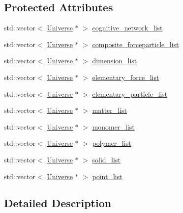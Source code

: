\subsection*{Protected Attributes}
\begin{DoxyCompactItemize}
\item 
std\+::vector$<$ \mbox{\hyperlink{class_universe}{Universe}} $\ast$ $>$ \mbox{\hyperlink{class_universe_a7a0e9796ff0d650a8b1fbde5fa5b761f}{cognitive\+\_\+network\+\_\+list}}
\item 
std\+::vector$<$ \mbox{\hyperlink{class_universe}{Universe}} $\ast$ $>$ \mbox{\hyperlink{class_universe_ae9795d06e406c4322637825aa545aa2f}{composite\+\_\+forceparticle\+\_\+list}}
\item 
std\+::vector$<$ \mbox{\hyperlink{class_universe}{Universe}} $\ast$ $>$ \mbox{\hyperlink{class_universe_a159461f7098c3a30274f54c8acff6eac}{dimension\+\_\+list}}
\item 
std\+::vector$<$ \mbox{\hyperlink{class_universe}{Universe}} $\ast$ $>$ \mbox{\hyperlink{class_universe_a015b19f6d5ad84ebaa9e3e7c8352389c}{elementary\+\_\+force\+\_\+list}}
\item 
std\+::vector$<$ \mbox{\hyperlink{class_universe}{Universe}} $\ast$ $>$ \mbox{\hyperlink{class_universe_aeb2e63cf49f0b5595e6c15109863bd3b}{elementary\+\_\+particle\+\_\+list}}
\item 
std\+::vector$<$ \mbox{\hyperlink{class_universe}{Universe}} $\ast$ $>$ \mbox{\hyperlink{class_universe_a409650bc0425fc22c7713487a2a6dd8e}{matter\+\_\+list}}
\item 
std\+::vector$<$ \mbox{\hyperlink{class_universe}{Universe}} $\ast$ $>$ \mbox{\hyperlink{class_universe_a3d55ba29f95a9793b69c01f7942eca9f}{monomer\+\_\+list}}
\item 
std\+::vector$<$ \mbox{\hyperlink{class_universe}{Universe}} $\ast$ $>$ \mbox{\hyperlink{class_universe_a4d898757f2d67ca5ab5d504388d6199a}{polymer\+\_\+list}}
\item 
std\+::vector$<$ \mbox{\hyperlink{class_universe}{Universe}} $\ast$ $>$ \mbox{\hyperlink{class_universe_a747f9d3cf0b2caada4461cb7b12ea17b}{solid\+\_\+list}}
\item 
std\+::vector$<$ \mbox{\hyperlink{class_universe}{Universe}} $\ast$ $>$ \mbox{\hyperlink{class_universe_a9dc8abd2f8f84318722184f38e1b8cc7}{point\+\_\+list}}
\end{DoxyCompactItemize}


\subsection{Detailed Description}


